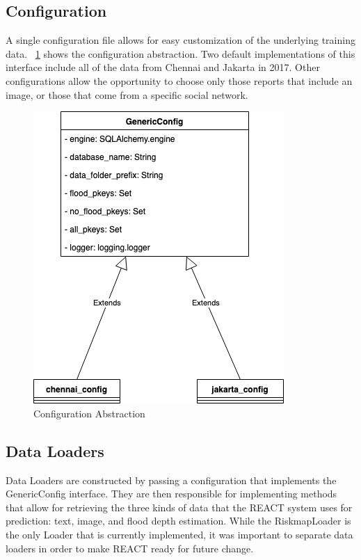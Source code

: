 \subsection{Configuration}
A single configuration file allows for easy customization of the underlying 
training data. \figureautorefname{}~\ref{fig:config} shows the configuration
abstraction. Two default implementations of this interface include all of the
data from Chennai and Jakarta in 2017. Other configurations allow the
opportunity to choose only those reports that include an image, or those that
come from a specific social network.
\begin{figure}[ht]
    \centering
    \includegraphics[scale=0.6]{images/config.jpg}
    \caption{Configuration Abstraction}\label{fig:config}
\end{figure}

\subsection{Data Loaders}
Data Loaders are constructed by passing a configuration that implements the 
GenericConfig interface. They are then responsible for implementing methods 
that allow for retrieving the three kinds of data that the REACT system 
uses for prediction: text, image, and flood depth estimation. While the
RiskmapLoader is the only Loader that is currently implemented, it was 
important to separate data loaders in order to make REACT ready for future change.

